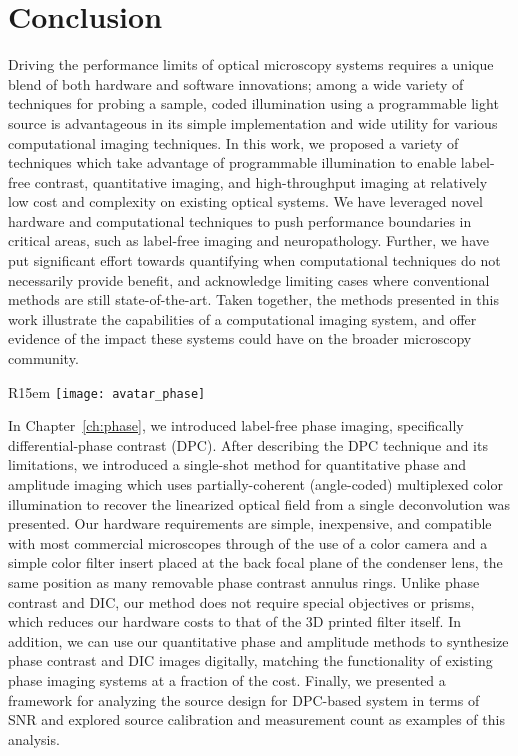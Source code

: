 \chapter{Conclusion}\label{ch:conclusion}
Driving the performance limits of optical microscopy systems requires a unique blend of both hardware and software innovations; among a wide variety of techniques for probing a sample, coded illumination using a programmable light source is advantageous in its simple implementation and wide utility for various computational imaging techniques. In this work, we proposed a variety of techniques which take advantage of programmable illumination to enable label-free contrast, quantitative imaging, and high-throughput imaging at relatively low cost and complexity on existing optical systems. We have leveraged novel hardware and computational techniques to push performance boundaries in critical areas, such as label-free imaging and neuropathology. Further, we have put significant effort towards quantifying when computational techniques do not necessarily provide benefit, and acknowledge limiting cases where conventional methods are still state-of-the-art. Taken together, the methods presented in this work illustrate the capabilities of a computational imaging system, and offer evidence of the impact these systems could have on the broader microscopy community.

\begin{wrapfigure}{R}{15em}
  \texttt{[image: avatar\_phase]}
\end{wrapfigure}

In Chapter~\ref{ch:phase}, we introduced label-free phase imaging, specifically differential-phase contrast (DPC). After describing the DPC technique and its limitations, we introduced a single-shot method for quantitative phase and amplitude imaging which uses partially-coherent (angle-coded) multiplexed color illumination to recover the linearized optical field from a single deconvolution was presented. Our hardware requirements are simple, inexpensive, and compatible with most commercial microscopes through of the use of a color camera and a simple color filter insert placed at the back focal plane of the condenser lens, the same position as many removable phase contrast annulus rings. Unlike phase contrast and DIC, our method does not require special objectives or prisms, which reduces our hardware costs to that of the 3D printed filter itself. In addition, we can use our quantitative phase and amplitude methods to synthesize phase contrast and DIC images digitally, matching the functionality of existing phase imaging systems at a fraction of the cost. Finally, we presented a framework for analyzing the source design for DPC-based system in terms of SNR and explored source calibration and measurement count as examples of this analysis.

